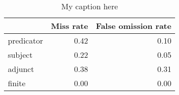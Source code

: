 \begin{table}[!ht]
\centering
\begin{tabular}{lrr}
\toprule
{} &  Miss rate &  False omission rate \\
\midrule
predicator &       0.42 &                 0.10 \\
subject    &       0.22 &                 0.05 \\
adjunct    &       0.38 &                 0.31 \\
finite     &       0.00 &                 0.00 \\
\bottomrule
\end{tabular}
\caption{My caption here}
\label{tab:unit-elements-mood-exact-errors}
\end{table}